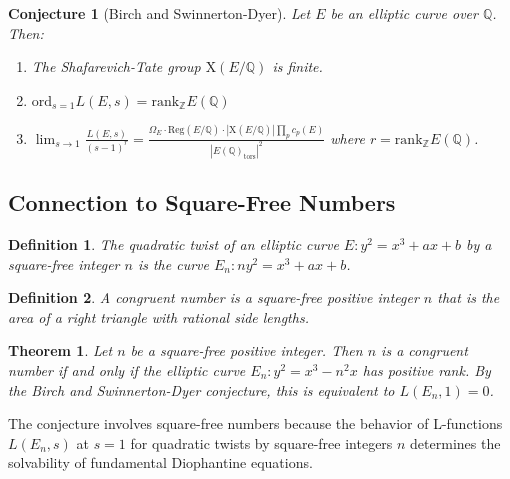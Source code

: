 \documentclass{article}
\newtheorem{conjecture}{Conjecture}
\newtheorem{definition}{Definition}
\newtheorem{theorem}{Theorem}
\begin{document}
\begin{conjecture}
  [Birch and Swinnerton-Dyer] Let $E$ be an elliptic curve over $\mathbb{Q}$.
  Then:
  \begin{enumerate}
    \item The Shafarevich-Tate group $\mathrm{X} (E /\mathbb{Q})$ is finite.
    
    \item $\mathrm{ord}_{s = 1} L (E, s) = \mathrm{rank}_{\mathbb{Z}} E
    (\mathbb{Q})$
    
    \item $\lim_{s \to 1}  \frac{L (E, s)}{(s - 1)^r} = \frac{\Omega_E \cdot
    \mathrm{Reg} (E /\mathbb{Q}) \cdot | \mathrm{X} (E /\mathbb{Q}) |  \prod_p
    c_p (E)}{|E (\mathbb{Q})_{\mathrm{tors}} |^2}$ where $r =
    \mathrm{rank}_{\mathbb{Z}} E (\mathbb{Q})$.
  \end{enumerate}
\end{conjecture}

\subsection{Connection to Square-Free Numbers}

\begin{definition}
  The quadratic twist of an elliptic curve $E : y^2 = x^3 + ax + b$ by a
  square-free integer $n$ is the curve $E_n : ny^2 = x^3 + ax + b$.
\end{definition}

\begin{definition}
  A congruent number is a square-free positive integer $n$ that is the area of
  a right triangle with rational side lengths.
\end{definition}

\begin{theorem}
  Let $n$ be a square-free positive integer. Then $n$ is a congruent number if
  and only if the elliptic curve $E_n : y^2 = x^3 - n^2 x$ has positive rank.
  By the Birch and Swinnerton-Dyer conjecture, this is equivalent to $L (E_n,
  1) = 0$.
\end{theorem}

The conjecture involves square-free numbers because the behavior of
L-functions $L (E_n, s)$ at $s = 1$ for quadratic twists by square-free
integers $n$ determines the solvability of fundamental Diophantine equations.

\
\end{document}
